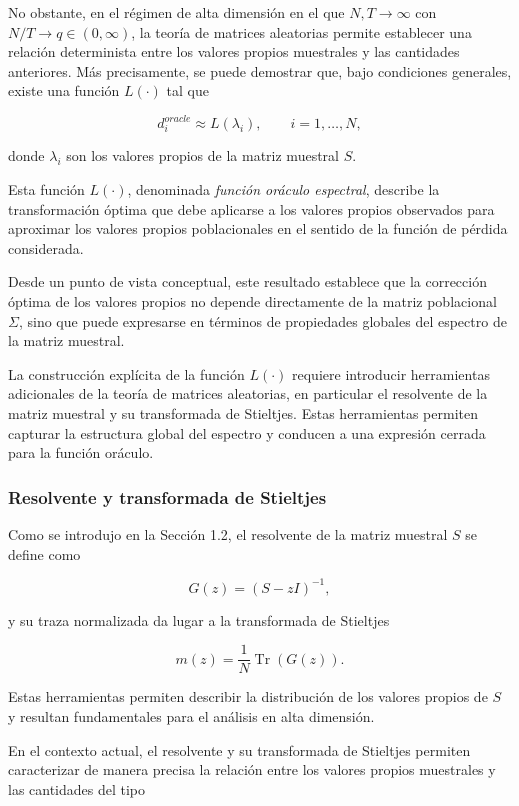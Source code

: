 \documentclass[letterpaper,12pt,oneside]{book}
\begin{document}
No obstante, en el régimen de alta dimensión en el que $N,T \to \infty$ con $N/T \to q \in (0,\infty)$, la teoría de matrices aleatorias permite establecer una relación determinista entre los valores propios muestrales y las cantidades anteriores. Más precisamente, se puede demostrar que, bajo condiciones generales, existe una función $L(\cdot)$ tal que

\[
d_i^{oracle} \approx L(\lambda_i),
\qquad i=1,\dots,N,
\]

donde $\lambda_i$ son los valores propios de la matriz muestral $S$.

Esta función $L(\cdot)$, denominada \textit{función oráculo espectral}, describe la transformación óptima que debe aplicarse a los valores propios observados para aproximar los valores propios poblacionales en el sentido de la función de pérdida considerada.

Desde un punto de vista conceptual, este resultado establece que la corrección óptima de los valores propios no depende directamente de la matriz poblacional $\Sigma$, sino que puede expresarse en términos de propiedades globales del espectro de la matriz muestral.

La construcción explícita de la función $L(\cdot)$ requiere introducir herramientas adicionales de la teoría de matrices aleatorias, en particular el resolvente de la matriz muestral y su transformada de Stieltjes. Estas herramientas permiten capturar la estructura global del espectro y conducen a una expresión cerrada para la función oráculo.

\subsubsection*{Resolvente y transformada de Stieltjes}

Como se introdujo en la Sección 1.2, el resolvente de la matriz muestral $S$ se define como

\[
G(z) = (S - zI)^{-1},
\]

y su traza normalizada da lugar a la transformada de Stieltjes

\[
m(z) = \frac{1}{N} \operatorname{Tr}(G(z)).
\]

Estas herramientas permiten describir la distribución de los valores propios de $S$ y resultan fundamentales para el análisis en alta dimensión.

En el contexto actual, el resolvente y su transformada de Stieltjes permiten caracterizar de manera precisa la relación entre los valores propios muestrales y las cantidades del tipo
\end{document}
